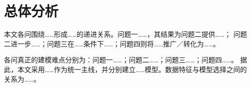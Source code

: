 
\section{总体分析}

本文各问围绕……形成……的递进关系。问题一……，其结果为问题二提供……；
问题二进一步……；问题三在……条件下……；问题四则将……推广／转化为……。

各问真正的建模难点分别为：问题一……；问题二……；问题三……；问题四……。
据此，本文采用……作为统一主线，并分别建立……模型。数据特征与模型选择之间的关系为……。

